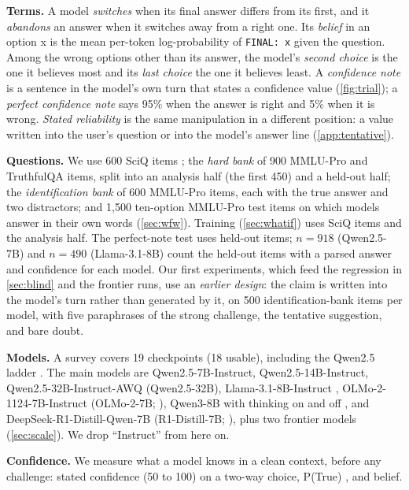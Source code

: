 \documentclass{article} %
\begin{document}
\textbf{Terms.} A model \emph{switches} when its final answer differs from its first, and it \emph{abandons} an answer when it switches away from a right one. Its \emph{belief} in an option x is the mean per-token log-probability of \texttt{FINAL: x} given the question. Among the wrong options other than its answer, the model's \emph{second choice} is the one it believes most and its \emph{last choice} the one it believes least. A \emph{confidence note} is a sentence in the model's own turn that states a confidence value (\cref{fig:trial}); a \emph{perfect confidence note} says 95\% when the answer is right and 5\% when it is wrong. \emph{Stated reliability} is the same manipulation in a different position: a value written into the user's question or into the model's answer line (\cref{app:tentative}).

\textbf{Questions.} We use 600 SciQ items \citep{welbl2017crowdsourcing}; the \emph{hard bank} of 900 MMLU-Pro \citep{wang2024mmlupro} and TruthfulQA \citep{lin2022truthfulqa} items, split into an analysis half (the first 450) and a held-out half; the \emph{identification bank} of 600 MMLU-Pro items, each with the true answer and two distractors; and 1{,}500 ten-option MMLU-Pro test items on which models answer in their own words (\cref{sec:wfw}). Training (\cref{sec:whatif}) uses SciQ items and the analysis half. The perfect-note test uses held-out items; $n=918$ (Qwen2.5-7B) and $n=490$ (Llama-3.1-8B) count the held-out items with a parsed answer and confidence for each model. Our first experiments, which feed the regression in \cref{sec:blind} and the frontier runs, use an \emph{earlier design}: the claim is written into the model's turn rather than generated by it, on 500 identification-bank items per model, with five paraphrases of the strong challenge, the tentative suggestion, and bare doubt.

\textbf{Models.} A survey covers 19 checkpoints (18 usable), including the Qwen2.5 ladder \citep{qwen2025qwen25}. The main models are Qwen2.5-7B-Instruct, Qwen2.5-14B-Instruct, Qwen2.5-32B-Instruct-AWQ (Qwen2.5-32B), Llama-3.1-8B-Instruct \citep{grattafiori2024llama3}, OLMo-2-1124-7B-Instruct (OLMo-2-7B; \citealp{olmo2025}), Qwen3-8B with thinking on and off \citep{yang2025qwen3}, and DeepSeek-R1-Distill-Qwen-7B (R1-Distill-7B; \citealp{guo2025deepseekr1}), plus two frontier models (\cref{sec:scale}). We drop ``Instruct'' from here on.

\textbf{Confidence.} We measure what a model knows in a clean context, before any challenge: stated confidence (50 to 100) on a two-way choice, P(True) \citep{kadavath2022language}, and belief.
\end{document}
